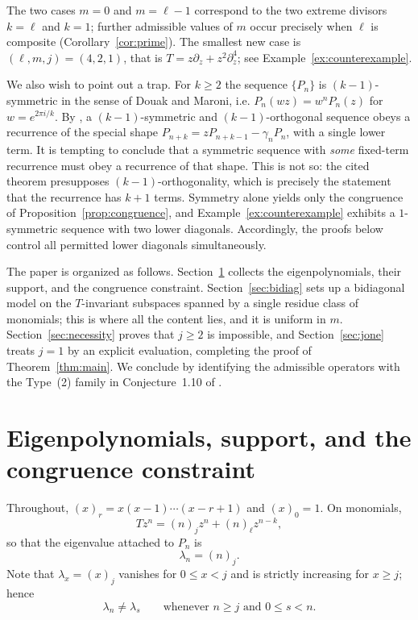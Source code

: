 \documentclass{amsart}
\theoremstyle{definition}
\newcommand{\fall}[2]{(#1)_{#2}}
\begin{document}
The two cases \(m=0\) and \(m=\ell-1\) correspond to the two extreme divisors
\(k=\ell\) and \(k=1\); further admissible values of \(m\) occur precisely
when \(\ell\) is composite (Corollary~\ref{cor:prime}).  The smallest new
case is \((\ell,m,j)=(4,2,1)\), that is
\(T=z\partial_z+z^2\partial_z^4\); see Example~\ref{ex:counterexample}.

We also wish to point out a trap.  For \(k\ge2\) the sequence \(\{P_n\}\) is
\((k-1)\)-symmetric in the sense of Douak and Maroni, i.e.
\(P_n(wz)=w^n P_n(z)\) for \(w=e^{2\pi i/k}\).  By
\cite[Th\'eor\`eme 5.1]{Douak}, a \((k-1)\)-symmetric and
\((k-1)\)-orthogonal sequence obeys a recurrence of the special shape
\(P_{n+k}=zP_{n+k-1}-\gamma_n P_n\), with a single lower term.  It is tempting
to conclude that a symmetric sequence with \emph{some} fixed-term recurrence
must obey a recurrence of that shape.  This is not so: the cited theorem
presupposes \((k-1)\)-orthogonality, which is precisely the statement that
the recurrence has \(k+1\) terms.  Symmetry alone yields only the congruence
of Proposition~\ref{prop:congruence}, and Example~\ref{ex:counterexample}
exhibits a \(1\)-symmetric sequence with two lower diagonals.  Accordingly,
the proofs below control all permitted lower diagonals simultaneously.

The paper is organized as follows.  Section~\ref{sec:eigen} collects the
eigenpolynomials, their support, and the congruence constraint.
Section~\ref{sec:bidiag} sets up a bidiagonal model on the \(T\)-invariant
subspaces spanned by a single residue class of monomials; this is where all
the content lies, and it is uniform in \(m\).  Section~\ref{sec:necessity}
proves that \(j\ge2\) is impossible, and Section~\ref{sec:jone} treats
\(j=1\) by an explicit evaluation, completing the proof of
Theorem~\ref{thm:main}.  We conclude by identifying the admissible operators
with the Type~(2) family in Conjecture~1.10 of \cite{HoShTa}.

\section{Eigenpolynomials, support, and the congruence constraint}
\label{sec:eigen}

Throughout, \(\fall{x}{r}=x(x-1)\cdots(x-r+1)\) and \(\fall{x}{0}=1\).  On
monomials,
\begin{equation}\label{eq:Tmon}
Tz^n=\fall{n}{j}z^n+\fall{n}{\ell}z^{n-k},
\end{equation}
so that the eigenvalue attached to \(P_n\) is
\begin{equation}\label{eq:eigenvalue}
\lambda_n=\fall{n}{j}.
\end{equation}
Note that \(\lambda_x=\fall{x}{j}\) vanishes for \(0\le x<j\) and is strictly
increasing for \(x\ge j\); hence
\begin{equation}\label{eq:distinct}
\lambda_n\ne\lambda_s
\qquad\text{whenever } n\ge j \text{ and } 0\le s<n .
\end{equation}
\end{document}
